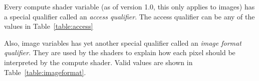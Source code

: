 \documentclass{article}
\begin{document}
Every compute shader variable (as of version 1.0, this only applies to images) has a special qualifier called an \textit{access qualifier}. The access qualifier can be any of the values in Table~\ref{table:access}

\begin{table}[hp]
\centering
\caption{Access modes}
\label{table:access}
\end{table}

Also, image variables has yet another special qualifier called an \textit{image format qualifier}. They are used by the shaders to explain how each pixel should be interpreted by the compute shader. Valid values are shown in Table~\ref{table:imageformat}.
\end{document}
